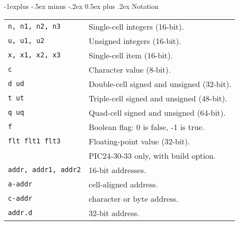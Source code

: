 \documentclass[10pt,landscape,a4paper]{article}
\makeatletter
\renewcommand{\subsection}{\@startsection{subsection}{2}{0mm}%
                                {-1explus -.5ex minus -.2ex}%
                                {0.5ex plus .2ex}%
                                {\normalfont\normalsize\bfseries}}
\makeatother
\begin{document}
\begin{multicols}{3}
\subsection{Notation}
\begin{tabular}{@{}ll@{}}
\verb!n, n1, n2, n3!  & Single-cell integers (16-bit). \\
\verb!u, u1, u2!  & Unsigned integers (16-bit). \\
\verb!x, x1, x2, x3!  & Single-cell item (16-bit). \\
\verb!c!  & Character value (8-bit). \\
\verb!d ud!  & Double-cell signed and unsigned (32-bit). \\
\verb!t ut!  & Triple-cell signed and unsigned (48-bit). \\
\verb!q uq!  & Quad-cell signed and unsigned (64-bit). \\
\verb!f!  & Boolean flag: 0 is false, -1 is true. \\
\verb!flt flt1 flt3! & Floating-point value (32-bit).\\
                     & PIC24-30-33 only, with build option. \\
\verb!addr, addr1, addr2! & 16-bit addresses. \\
\verb!a-addr! & cell-aligned address. \\
\verb!c-addr! & character or byte address. \\
\verb!addr.d! & 32-bit address. \\
\end{tabular}


\end{multicols}
\end{document}
